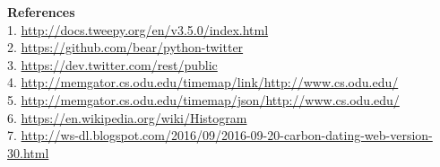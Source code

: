 \documentclass{article}
\begin{document}
\textbf{References}\\

1.  \url{http://docs.tweepy.org/en/v3.5.0/index.html}\\

2. \url{https://github.com/bear/python-twitter}\\

3. \url{https://dev.twitter.com/rest/public}\\

4.  \url{http://memgator.cs.odu.edu/timemap/link/http://www.cs.odu.edu/}\\

5. \url{http://memgator.cs.odu.edu/timemap/json/http://www.cs.odu.edu/}\\

6. \url{https://en.wikipedia.org/wiki/Histogram}\\

7. \url{http://ws-dl.blogspot.com/2016/09/2016-09-20-carbon-dating-web-version-30.html}

\end{document}

